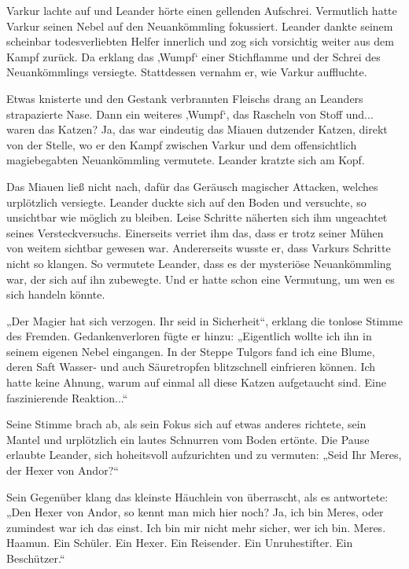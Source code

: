Varkur lachte auf und Leander hörte einen gellenden Aufschrei. Vermutlich hatte Varkur seinen Nebel auf den Neuankömmling fokussiert. Leander dankte seinem scheinbar todesverliebten Helfer innerlich und zog sich vorsichtig weiter aus dem Kampf zurück. Da erklang das ‚Wumpf‘ einer Stichflamme und der Schrei des Neuankömmlings versiegte. Stattdessen vernahm er, wie Varkur auffluchte.

Etwas knisterte und den Gestank verbrannten Fleischs drang an Leanders strapazierte Nase. Dann ein weiteres ‚Wumpf‘, das Rascheln von Stoff und... waren das Katzen? Ja, das war eindeutig das Miauen dutzender Katzen, direkt von der Stelle, wo er den Kampf zwischen Varkur und dem offensichtlich magiebegabten Neuankömmling vermutete. Leander kratzte sich am Kopf.

Das Miauen ließ nicht nach, dafür das Geräusch magischer Attacken, welches urplötzlich versiegte. Leander duckte sich auf den Boden und versuchte, so unsichtbar wie möglich zu bleiben. Leise Schritte näherten sich ihm ungeachtet seines Versteckversuchs. Einerseits verriet ihm das, dass er trotz seiner Mühen von weitem sichtbar gewesen war. Andererseits wusste er, dass Varkurs Schritte nicht so klangen. So vermutete Leander, dass es der mysteriöse Neuankömmling war, der sich auf ihn zubewegte. Und er hatte schon eine Vermutung, um wen es sich handeln könnte.\bigskip







„Der Magier hat sich verzogen. Ihr seid in Sicherheit“, erklang die tonlose Stimme des Fremden. Gedankenverloren fügte er hinzu: „Eigentlich wollte ich ihn in seinem eigenen Nebel eingangen. In der Steppe Tulgors fand ich eine Blume, deren Saft Wasser- und auch Säuretropfen blitzschnell einfrieren können. Ich hatte keine Ahnung, warum auf einmal all diese Katzen aufgetaucht sind. Eine faszinierende Reaktion...“

Seine Stimme brach ab, als sein Fokus sich auf etwas anderes richtete, sein Mantel und urplötzlich ein lautes Schnurren vom Boden ertönte. Die Pause erlaubte Leander, sich hoheitsvoll aufzurichten und zu vermuten: „Seid Ihr Meres, der Hexer von Andor?“

Sein Gegenüber klang das kleinste Häuchlein von überrascht, als es antwortete: „Den Hexer von Andor, so kennt man mich hier noch? Ja, ich bin Meres, oder zumindest war ich das einst. Ich bin mir nicht mehr sicher, wer ich bin. Meres. Haamun. Ein Schüler. Ein Hexer. Ein Reisender. Ein Unruhestifter. Ein Beschützer.“

